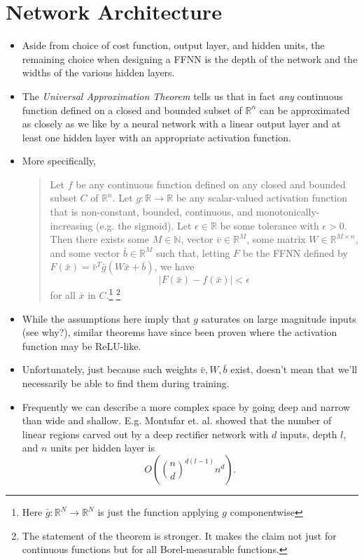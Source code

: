 \documentclass{article}
\begin{document}
\section{Network Architecture}
\begin{itemize}
\item Aside from choice of cost function, output layer, and hidden units, the remaining choice when designing a FFNN is the depth of the network and the widths of the various hidden layers.

\item The \emph{Universal Approximation Theorem} tells us that in fact \emph{any} continuous function defined on a closed and bounded subset of $\mathbb{R}^{n}$ can be approximated as closely as we like by a neural network with a linear output layer and at least one hidden layer with an appropriate activation function.

\item More specifically,
\begin{quote} Let $f$ be any continuous function defined on any closed and bounded subset $C$ of $\mathbb{R}^{n}$.  Let $g:\mathbb{R}\rightarrow \mathbb{R}$ be any scalar-valued activation function that is non-constant, bounded, continuous, and monotonically-increasing (e.g. the sigmoid).  Let $\epsilon \in \mathbb{R}$ be some tolerance with $\epsilon > 0$.  \\
Then there exists some $M \in \mathbb{N}$, vector $\bar{v}\in \mathbb{R}^{M}$, some matrix $W \in \mathbb{R}^{M\times n}$, and some vector $\bar{b} \in \mathbb{R}^{M}$ such that, letting $F$ be the FFNN defined by $F(\bar{x}) = \bar{v}^{T} \bar{g}(W\bar{x} + \bar{b})$, we have 
$$\vert F(\bar{x}) - f(\bar{x}) \vert < \epsilon$$ for all $\bar{x}$ in $C.$\footnote{Here $\bar{g}:\mathbb{R}^{N} \rightarrow \mathbb{R}^{N}$ is just the function applying $g$ componentwise} \footnote{ The statement of the theorem is stronger.  It makes the claim not just for continuous functions but for all Borel-measurable functions.}
\end{quote}

\item While the assumptions here imply that $g$ saturates on large magnitude inputs (see why?), similar theorems have since been proven where the activation function may be ReLU-like.

\item Unfortunately, just because such weights $\bar{v}, W, \bar{b}$ exist, doesn't mean that we'll necessarily be able to find them during training.

\item Frequently we can describe a more complex space by going deep and narrow than wide and shallow.  E.g.  Montufar et. al. showed that the number of linear regions carved out by a deep rectifier network with $d$ inputs, depth $l$, and $n$ units per hidden layer is
$$O\left( \binom{n}{d}^{d(l-1)}n^{d}\right).$$

\end{itemize}
\end{document}
